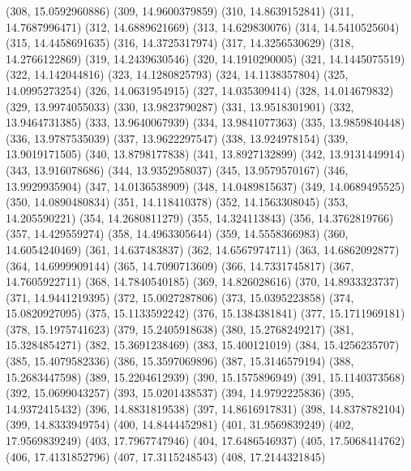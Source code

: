 {					(308, 15.0592960886)
					(309, 14.9600379859)
					(310, 14.8639152841)
					(311, 14.7687996471)
					(312, 14.6889621669)
					(313, 14.629830076)
					(314, 14.5410525604)
					(315, 14.4458691635)
					(316, 14.3725317974)
					(317, 14.3256530629)
					(318, 14.2766122869)
					(319, 14.2439630546)
					(320, 14.1910290005)
					(321, 14.1445075519)
					(322, 14.142044816)
					(323, 14.1280825793)
					(324, 14.1138357804)
					(325, 14.0995273254)
					(326, 14.0631954915)
					(327, 14.035309414)
					(328, 14.014679832)
					(329, 13.9974055033)
					(330, 13.9823790287)
					(331, 13.9518301901)
					(332, 13.9464731385)
					(333, 13.9640067939)
					(334, 13.9841077363)
					(335, 13.9859840448)
					(336, 13.9787535039)
					(337, 13.9622297547)
					(338, 13.924978154)
					(339, 13.9019171505)
					(340, 13.8798177838)
					(341, 13.8927132899)
					(342, 13.9131449914)
					(343, 13.916078686)
					(344, 13.9352958037)
					(345, 13.9579570167)
					(346, 13.9929935904)
					(347, 14.0136538909)
					(348, 14.0489815637)
					(349, 14.0689495525)
					(350, 14.0890480834)
					(351, 14.118410378)
					(352, 14.1563308045)
					(353, 14.205590221)
					(354, 14.2680811279)
					(355, 14.324113843)
					(356, 14.3762819766)
					(357, 14.429559274)
					(358, 14.4963305644)
					(359, 14.5558366983)
					(360, 14.6054240469)
					(361, 14.637483837)
					(362, 14.6567974711)
					(363, 14.6862092877)
					(364, 14.6999909144)
					(365, 14.7090713609)
					(366, 14.7331745817)
					(367, 14.7605922711)
					(368, 14.7840540185)
					(369, 14.826028616)
					(370, 14.8933323737)
					(371, 14.9441219395)
					(372, 15.0027287806)
					(373, 15.0395223858)
					(374, 15.0820927095)
					(375, 15.1133592242)
					(376, 15.1384381841)
					(377, 15.1711969181)
					(378, 15.1975741623)
					(379, 15.2405918638)
					(380, 15.2768249217)
					(381, 15.3284854271)
					(382, 15.3691238469)
					(383, 15.400121019)
					(384, 15.4256235707)
					(385, 15.4079582336)
					(386, 15.3597069896)
					(387, 15.3146579194)
					(388, 15.2683447598)
					(389, 15.2204612939)
					(390, 15.1575896949)
					(391, 15.1140373568)
					(392, 15.0699043257)
					(393, 15.0201438537)
					(394, 14.9792225836)
					(395, 14.9372415432)
					(396, 14.8831819538)
					(397, 14.8616917831)
					(398, 14.8378782104)
					(399, 14.8333949754)
					(400, 14.8444452981)
					(401, 31.9569839249)
					(402, 17.9569839249)
					(403, 17.7967747946)
					(404, 17.6486546937)
					(405, 17.5068414762)
					(406, 17.4131852796)
					(407, 17.3115248543)
					(408, 17.2144321845)
}
